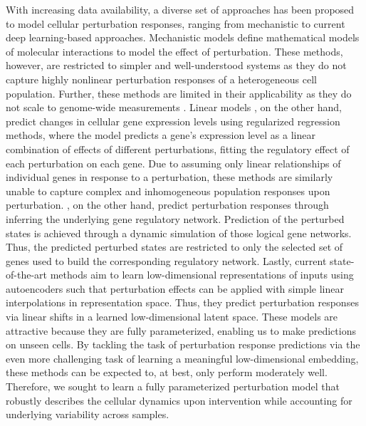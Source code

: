 With increasing data availability, a diverse set of approaches has been proposed to model cellular perturbation responses, ranging from mechanistic to current deep learning-based approaches.
Mechanistic models \citep{yuan2021cellbox, frohlich2018efficient} define mathematical models of molecular interactions to model the effect of perturbation.
These methods, however, are restricted to simpler and well-understood systems as they do not capture highly nonlinear perturbation responses of a heterogeneous cell population. Further, these methods are limited in their applicability as they do not scale to genome-wide measurements \citep{snijder2012single, berchtold2018systems, green2016systems}.
Linear models \citep{dixit2016perturb, kamimoto2020celloracle}, on the other hand,  predict changes in cellular gene expression levels using regularized regression methods, where the model predicts a gene's expression level as a linear combination of effects of different perturbations, fitting the regulatory effect of each perturbation on each gene.
Due to assuming only linear relationships of individual genes in response to a perturbation, these methods are similarly  unable to capture complex and inhomogeneous population responses upon perturbation.
\citet{heydari2022iqcell}, on the other hand, predict perturbation responses through inferring the underlying gene regulatory network. Prediction of the perturbed states is achieved through a dynamic simulation of those logical gene networks. Thus, the predicted perturbed states are restricted to only the selected set of genes used to build the corresponding regulatory network.
Lastly, current state-of-the-art methods \citep{lopez2018scvi, lotfollahi2019scgen, yang2020predicting} aim to learn low-dimensional representations of inputs using autoencoders such that perturbation effects can be applied with simple linear interpolations in representation space. Thus, they predict perturbation responses via linear shifts in a learned low-dimensional latent space. These models are attractive because they are fully parameterized, enabling us to make predictions on unseen cells. By tackling the task of perturbation response predictions via the even more challenging task of learning a meaningful low-dimensional embedding, these methods can be expected to, at best, only perform moderately well. Therefore, we sought to learn a fully parameterized perturbation model that robustly describes the cellular dynamics upon intervention while accounting for underlying variability across samples.


